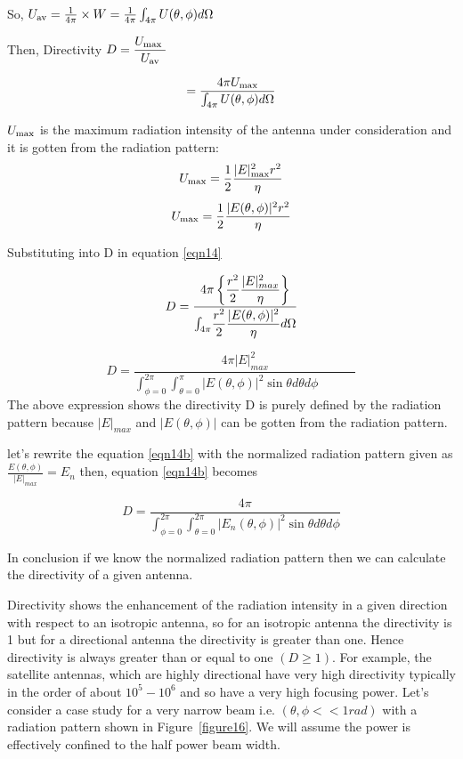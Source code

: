 \begin{enumerate}
So, $U_{\textnormal{av}}=\frac{1}{4\pi} \times W = \frac{1}{4\pi}\int_{4\pi}U(\theta ,\phi)d\Omega$

Then, Directivity $D=\dfrac{U_{\textnormal{max
}}}{U_{\textnormal{av}}}$ 

\begin{equation}
= \frac{4\pi U_{\textnormal{max}}}{\int_{4\pi}U(\theta,\phi)d\Omega}
\label{eqn14}
\end{equation}

$U_{\textnormal{max}}$ is the maximum radiation intensity of the antenna under consideration and it is gotten from the radiation pattern:
$$U_{\textnormal{max}}=\frac{1}{2}\frac{|E|^{2}_{\textnormal{max}}r^{2}}{\eta}$$
$$U_{\textnormal{max}}=\frac{1}{2}\frac{|E(\theta,\phi)|^{2}r^{2}}{\eta}$$

Substituting into D in equation \ref{eqn14}

$$
D = \dfrac{4\pi\left\{\dfrac{r^2}{2}
	\dfrac{|E|^2_{max}}{\eta}\right\}}
{{\Large \int_{4\pi}}\dfrac{r^2}{2}
	\dfrac{|E(\theta,\phi)|^2}{\eta}d\Omega }
$$

\begin{equation}
D = \dfrac{4\pi|E|^2_{max}}{\int^{ 2\pi}_{\phi=0}\int^{ \pi}_{\theta=0}|E(\theta,\phi)|^2\sin\theta d\theta d\phi \qquad \quad}
\label{eqn14b}
\end{equation}
The above expression shows the directivity D is purely defined by the radiation pattern because $|E|_{max}$ and $|E(\theta, \phi)|$ can be gotten from the radiation pattern.

let's rewrite the equation \ref{eqn14b} with the normalized radiation pattern given as $\frac{E(\theta, \phi)}{|E|_{max}} = E_n$ then, equation \ref{eqn14b} becomes

\begin{equation}
D = \frac{4\pi}{\int_{\phi = 0}^{2\pi}\int_{\theta = 0}^{2\pi}|E_n(\theta, \phi)|^2\sin\theta d\theta d\phi}
\label{eqn14c}
\end{equation}

In conclusion if we know the normalized radiation pattern then we can calculate the directivity of a given antenna.
		
Directivity shows the enhancement of the radiation intensity in a given direction with respect to an isotropic antenna, so for an isotropic antenna the directivity is 1 but for a directional antenna the directivity is greater than one. Hence directivity is always greater than or equal to one $(D\geq 1)$.
For example, the satellite antennas, which are highly directional have very high directivity typically in the order of about $10^{5}-10^{6}$ and so have a very high focusing power.	Let's consider a case study for a very narrow beam i.e. $(\theta, \phi << 1rad)$ with a radiation pattern shown in Figure~\ref{figure16}. We will assume the power is effectively confined to the half power beam width.  


\end{enumerate}
